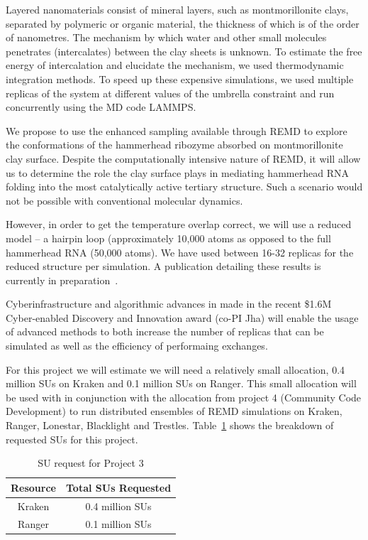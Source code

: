 \documentclass[a4paper,11pt]{article}
\newcommand{\up}{\vspace*{-1em}}
\begin{document}
Layered nanomaterials consist of mineral layers, such as montmorillonite clays, separated by polymeric or organic material, the thickness of which is of the order of nanometres. The mechanism by which water and other small molecules penetrates (intercalates) between the clay sheets is unknown. To estimate the free energy of intercalation and elucidate the mechanism, we used thermodynamic integration methods. To speed up these expensive simulations, we used multiple replicas of the system at different values of the umbrella constraint and run concurrently using the MD code LAMMPS. 

We propose to use the enhanced sampling available through REMD to explore the conformations of the hammerhead ribozyme absorbed on montmorillonite clay surface. Despite the computationally intensive nature of REMD, it will allow us to determine the role the clay surface plays in mediating hammerhead RNA folding into the most catalytically active tertiary structure. Such a scenario would not be possible with conventional molecular dynamics.

However, in order to get the temperature overlap correct, we will use a reduced model -- a hairpin loop (approximately 10,000 atoms as opposed to the full hammerhead RNA (50,000 atoms).  We have used between 16-32 replicas for the reduced structure per simulation. %
A publication detailing these results is currently in preparation~\cite{Ref11}.

Cyberinfrastructure and algorithmic advances in made in the recent \$1.6M Cyber-enabled Discovery and Innovation award (co-PI Jha) will enable the usage of advanced methods to both increase the number of replicas that can be simulated as well as the efficiency of performaing exchanges.



For this project we will estimate we will need a relatively small allocation, 0.4 million SUs on Kraken and 0.1 million SUs on Ranger. This small allocation will be used with in conjunction with the allocation from project 4 (Community Code Development) to run distributed ensembles of REMD simulations on Kraken, Ranger, Lonestar, Blacklight and Trestles. Table~\ref{table:project3} shows the breakdown of requested SUs for this project.


\begin{table}[!h]
\begin{center}
\begin{tabular}{|c|c| }
\hline 
Resource & Total SUs Requested \\ 
\hline
Kraken   & 0.4 million SUs \\
\hline
Ranger   & 0.1 million SUs \\
\hline
\end{tabular}
\end{center}
  \caption{SU request for Project 3}\label{table:project3}
\up
\end{table}
\end{document}
